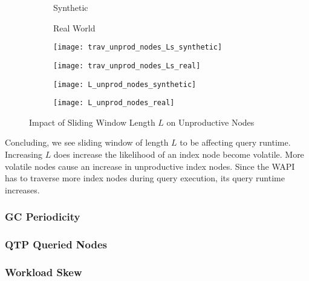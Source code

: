 \documentclass[abstracton,12pt]{scrartcl}
\theoremstyle{definition}
\begin{document}
\begin{figure}
  \centering
  \begin{subfigure}{0.49\linewidth}
    \centering
    Synthetic
  \end{subfigure}
  \begin{subfigure}{0.49\linewidth}
    \centering
    Real World
  \end{subfigure}
  \begin{subfigure}{0.49\linewidth}
    \centering
    \texttt{[image: trav\_unprod\_nodes\_Ls\_synthetic]}
    \caption{}
    \label{fig:trav_unprod_nodes_Ls_synthetic}
  \end{subfigure}
  \begin{subfigure}{0.49\linewidth}
    \centering
    \texttt{[image: trav\_unprod\_nodes\_Ls\_real]}
    \caption{}
    \label{fig:trav_unprod_nodes_Ls_real}
  \end{subfigure}
  \begin{subfigure}{0.49\linewidth}
    \centering
    \texttt{[image: L\_unprod\_nodes\_synthetic]}
    \caption{}
    \label{fig:L_trav_unprod_nodes_synthetic}
  \end{subfigure}
  \begin{subfigure}{0.49\linewidth}
    \centering
    \texttt{[image: L\_unprod\_nodes\_real]}
    \caption{}
    \label{fig:L_trav_unprod_nodes_real}
  \end{subfigure}
  \caption{Impact of Sliding Window Length $L$ on Unproductive Nodes}
\end{figure}

Concluding, we see sliding window of length $L$ to be affecting query runtime.
Increasing $L$ does increase the likelihood of an index node become volatile.
More volatile nodes cause an increase in unproductive index nodes. Since the
WAPI has to traverse more index nodes during query execution, its query runtime
increases.

\subsubsection{GC Periodicity}

\subsubsection{QTP Queried Nodes}

\subsubsection{Workload Skew}
\end{document}
